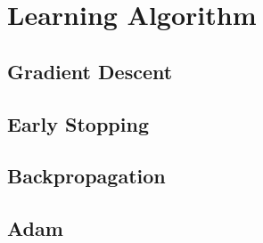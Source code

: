 \section{Learning Algorithm}
\subsection{Gradient Descent}
\subsection{Early Stopping}
\subsection{Backpropagation}
\subsection{Adam}